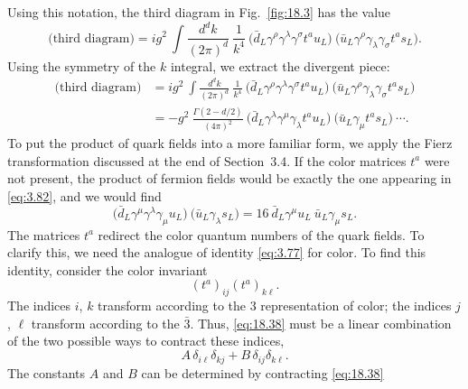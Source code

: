 Using this notation, the third diagram in Fig.~\ref{fig:18.3} has the value
\begin{equation}
  \text{(third diagram)} = ig^2\ \int \frac{d^dk}{(2\pi)^d}\ \frac{1}{k^4}\
    \bigl( \bar{d}_L\gamma^\rho\gamma^\lambda\gamma^\sigma t^a u_L \bigr)\
    \bigl( \bar{u}_L\gamma^\rho\gamma_\lambda\gamma_\sigma t^a s_L \bigr) .
  \label{eq:18.35}
\end{equation}
Using the symmetry of the $k$ integral, we extract the divergent piece:
\begin{equation}
  \begin{aligned}
    \text{(third diagram)} &= ig^2\ \int \frac{d^dk}{(2\pi)^d}\ \frac{1}{k^4}\
      \bigl( \bar{d}_L\gamma^\rho\gamma^\lambda\gamma^\sigma t^a u_L \bigr)\
      \bigl( \bar{u}_L\gamma^\rho\gamma_\lambda\gamma_\sigma t^a s_L \bigr)\\
    &= -g^2\ \frac{\Gamma(2-d/2)}{(4\pi)^2}\ \bigl( \bar{d}_L\gamma^\lambda
      \gamma^\mu\gamma_\lambda t^a u_L \bigr)\ \bigl( \bar{u}_L\gamma_\mu
        t^a s_L \bigr)\ \cdots .
  \end{aligned}
  \label{eq:18.36}
\end{equation}
To put the product of quark fields into a more familiar form, we apply the
Fierz transformation discussed at the end of Section~3.4.  If the color
matrices $t^a$ were not present, the product of fermion fields would be
exactly the one appearing in \eqref{eq:3.82}, and we would find
\begin{equation}
  \bigl( \bar{d}_L\gamma^\mu\gamma^\lambda\gamma_\mu u_L \bigr)\
    \bigl( \bar{u}_L\gamma_\lambda s_L \bigr) = 16\ \bar{d}_L\gamma^\mu u_L\
    \bar{u}_L\gamma_\mu s_L .
  \label{eq:18.37}
\end{equation}
The matrices $t^a$ redirect the color quantum numbers of the quark fields.
To clarify this, we need the analogue of identity \eqref{eq:3.77} for color.
To find this identity, consider the color invariant
\begin{equation}
  (t^a)_{ij}(t^a)_{k\ell} .
  \label{eq:18.38}
\end{equation}
The indices $i$, $k$ transform according to the 3 representation of color; the
indices $j$, $\ell$ transform according to the $\bar{3}$.  Thus,
\eqref{eq:18.38} must be a linear combination of the two possible ways to
contract these indices,
\begin{equation}
  A\,\delta_{i\ell}\delta_{kj} + B\,\delta_{ij}\delta_{k\ell} .
  \label{eq:18.39}
\end{equation}
The constants $A$ and $B$ can be determined by contracting \eqref{eq:18.38}
